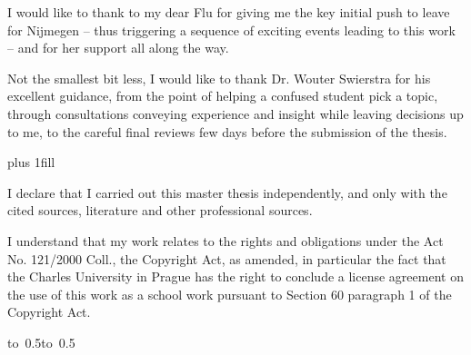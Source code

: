 \newpage



\openright

\noindent
I would like to thank to my dear Flu for giving me the key initial push to leave for
Nijmegen -- thus triggering a sequence of exciting events leading to this work --
and for her support all along the way.

Not the smallest bit less, I would like to thank Dr. Wouter Swierstra for his excellent
guidance, from the point of helping a confused student pick a topic, through consultations
conveying experience and insight while leaving decisions up to me, to the careful final reviews
few days before the submission of the thesis.
\newpage


\vglue 0pt plus 1fill

\noindent
I declare that I carried out this master thesis independently, and only with the cited
sources, literature and other professional sources.

\medskip\noindent
I understand that my work relates to the rights and obligations under the Act No.
121/2000 Coll., the Copyright Act, as amended, in particular the fact that the Charles
University in Prague has the right to conclude a license agreement on the use of this
work as a school work pursuant to Section 60 paragraph 1 of the Copyright Act.

\vspace{10mm}

\hbox{\hbox to 0.5\hbox to 0.5}

\vspace{20mm}
\newpage


